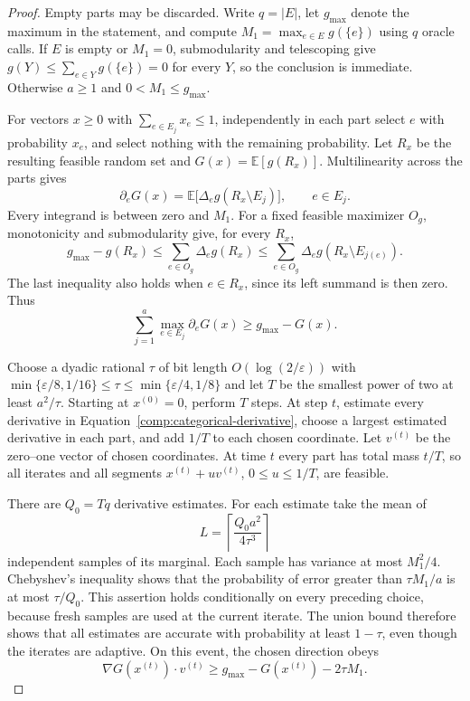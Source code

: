\begin{proof}
Empty parts may be discarded.  Write $q=|E|$, let $g_{\max}$ denote the
maximum in the statement, and compute
$M_1=\max_{e\in E}g(\{e\})$ using $q$ oracle calls.  If $E$ is empty or
$M_1=0$, submodularity and telescoping give $g(Y)\le\sum_{e\in Y}
g(\{e\})=0$ for every $Y$, so the conclusion is immediate.  Otherwise
$a\ge1$ and $0<M_1\le g_{\max}$.

For vectors $x\ge0$ with $\sum_{e\in E_j}x_e\le1$, independently in
each part select $e$ with probability $x_e$, and select nothing with the
remaining probability.  Let $R_x$ be the resulting feasible random set
and $G(x)=\mathbb E[g(R_x)]$.  Multilinearity across the parts gives
\begin{equation}
 \partial_eG(x)=\mathbb E\bigl[
   \Delta_e g(R_x\setminus E_j)\bigr],\qquad e\in E_j.
 \label{comp:categorical-derivative}
\end{equation}
Every integrand is between zero and $M_1$.  For a fixed feasible
maximizer $O_g$, monotonicity and submodularity give, for every $R_x$,
\[
 g_{\max}-g(R_x)
 \le\sum_{e\in O_g}\Delta_e g(R_x)
 \le\sum_{e\in O_g}\Delta_e g(R_x\setminus E_{j(e)}).
\]
The last inequality also holds when $e\in R_x$, since its left summand
is then zero.  Thus
\begin{equation}
 \sum_{j=1}^a\max_{e\in E_j}\partial_eG(x)
       \ge g_{\max}-G(x).
 \label{comp:derivative-direction}
\end{equation}

Choose a dyadic rational $\tau$ of bit length $O(\log(2/\varepsilon))$ with
$\min\{\varepsilon/8,1/16\}\le\tau\le\min\{\varepsilon/4,1/8\}$ and
let $T$ be the smallest power of two at least $a^2/\tau$.  Starting at
$x^{(0)}=0$, perform $T$ steps.  At step $t$, estimate every derivative
in Equation~\eqref{comp:categorical-derivative}, choose a largest
estimated derivative in each part, and add $1/T$ to each chosen
coordinate.  Let $v^{(t)}$ be the zero--one vector of chosen coordinates.
At time $t$ every part has total mass $t/T$, so all iterates and all
segments $x^{(t)}+uv^{(t)}$, $0\le u\le1/T$, are feasible.

There are $Q_0=Tq$ derivative estimates.  For each estimate take the
mean of
\[
 L=\left\lceil\frac{Q_0a^2}{4\tau^3}\right\rceil
\]
independent samples of its marginal.  Each sample has variance at most
$M_1^2/4$.  Chebyshev's inequality shows that the probability of error
greater than $\tau M_1/a$ is at most $\tau/Q_0$.  This assertion holds
conditionally on every preceding choice, because fresh samples are
used at the current iterate.  The union bound therefore shows that all
estimates are accurate with probability at least $1-\tau$, even though
the iterates are adaptive.  On this event, the chosen direction obeys
\begin{equation}
 \nabla G(x^{(t)})\cdot v^{(t)}
 \ge g_{\max}-G(x^{(t)})-2\tau M_1.
 \label{comp:estimated-direction}
\end{equation}


\end{proof}
